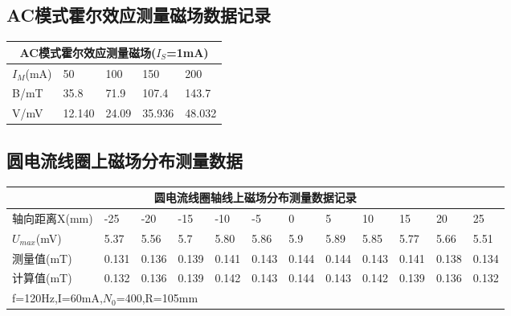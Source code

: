 \documentclass[12pt,a4paper]{article}
\begin{document}
    \subsection{AC模式霍尔效应测量磁场数据记录}
        \begin{table}[H]
            \centering
            \begin{tabular}{|l|l|l|l|l|}
            \hline
                \multicolumn{5}{|c|}{AC模式霍尔效应测量磁场($I_S$=1mA)} \\ \hline
                $I_M$(mA) & 50 & 100 & 150 & 200 \\ \hline
                B/mT & 35.8 & 71.9 & 107.4 & 143.7 \\ \hline
                V/mV & 12.140 & 24.09 & 35.936 & 48.032 \\ \hline
            \end{tabular}
        \end{table}

    \subsection{圆电流线圈上磁场分布测量数据}
        \begin{table}[H]
            \centering
            \begin{tabular}{|l|l|l|l|l|l|l|l|l|l|l|l|}
            \hline
                \multicolumn{12}{|c|}{圆电流线圈轴线上磁场分布测量数据记录}  \\ \hline
                轴向距离X(mm) & -25 & -20 & -15 & -10 & -5 & 0 & 5 & 10 & 15 & 20 & 25 \\ \hline
                $U_{max}$(mV) & 5.37 & 5.56 & 5.7 & 5.80 & 5.86 & 5.9 & 5.89 & 5.85 & 5.77 & 5.66 & 5.51 \\ \hline
                测量值(mT) & 0.131 & 0.136 & 0.139 & 0.141 & 0.143 & 0.144 & 0.144 & 0.143 & 0.141 & 0.138 &0.134  \\ \hline
                计算值(mT) & 0.132 & 0.136 & 0.139 & 0.142 & 0.143 & 0.144 & 0.143 & 0.142 & 0.139 & 0.136 & 0.132 \\ \hline
                \multicolumn{12}{|l|}{f=120Hz,I=60mA,$N_0$=400,R=105mm} \\ \hline
            \end{tabular}
        \end{table}
\end{document}
